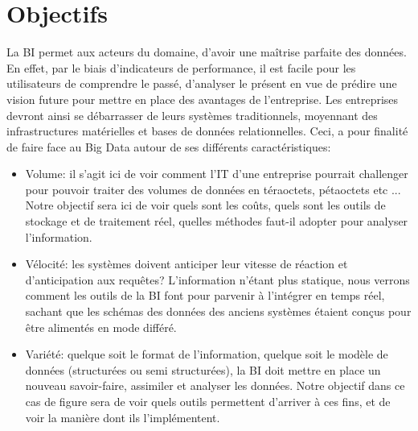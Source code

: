 \documentclass[12pt,a4wide,twoside]{report}
\begin{document}
	\section{Objectifs}
La BI permet aux acteurs du domaine, d'avoir une maîtrise parfaite des données. En effet, par le biais d'indicateurs de performance, il est facile pour les utilisateurs de comprendre le passé, d'analyser le présent en vue de prédire une vision future pour mettre en place des avantages de l'entreprise.\newline
Les entreprises devront ainsi se débarrasser de leurs systèmes traditionnels, moyennant des infrastructures matérielles et bases de données relationnelles. Ceci, a pour finalité de faire face au Big Data autour de ses différents caractéristiques:
\begin{itemize}
	\item Volume: il s'agit ici de voir comment l'IT d'une entreprise pourrait challenger pour pouvoir traiter des volumes de données en téraoctets, pétaoctets etc ...
	Notre objectif sera ici de voir quels sont les coûts, quels sont les outils de stockage et de traitement réel, quelles méthodes faut-il adopter pour analyser l'information. \newline
	\item Vélocité: les systèmes doivent anticiper leur vitesse de réaction et d'anticipation aux requêtes? L'information n'étant plus statique, nous verrons comment les outils de la BI font pour parvenir à l'intégrer en temps réel, sachant que les schémas des données des anciens systèmes étaient conçus pour être alimentés en mode différé.\newline
	\item Variété: quelque soit le format de l'information, quelque soit le modèle de données (structurées ou semi structurées), la BI doit mettre en place un nouveau savoir-faire, assimiler et analyser les données. Notre objectif dans ce cas de figure sera de voir quels outils permettent d'arriver à ces fins, et de voir la manière dont ils l'implémentent.
	
\end{itemize}


	
\end{document}
